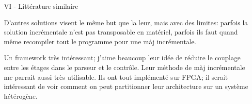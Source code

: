 VI - Littérature similaire

D'autres solutions visent le même but que la leur, mais avec des limites: parfois la solution incrémentale n'est pas transposable en matériel, parfois ils faut quand même recompiler tout le programme pour une màj incrémentale.

 Un framework très intéressant; j'aime beaucoup leur idée de réduire le couplage entre les étages dans le parseur et le contrôle. Leur méthode de màj incrémentale me parrait aussi très utilisable. Ils ont tout implémenté sur FPGA; il serait intéressant de voir comment on peut partitionner leur architecture sur un système hétérogène.

\clearpage
